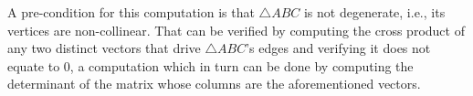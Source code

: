 A pre-condition for this computation is that $\triangle ABC$ is not degenerate,
i.e., its vertices are non-collinear.  That can be verified by computing the
cross product of any two distinct vectors that drive $\triangle ABC$'s edges and
verifying it does not equate to $0$, a computation which in turn can be done by
computing the determinant of the matrix whose columns are the aforementioned
vectors.
%
{\color{cyan}
\begin{comment}{}
The Laplace expansion for the determinant of a generic matrix $A \in
\mathbb{R}^{n \times n}$ is given by
%
\begin{align}
  \det(A) = \begin{vmatrix}
              a_{11} & \cdots & a_{1n} \\
              \vdots & \ddots & \vdots \\
              a_{n1} & \cdots & a_{nn}
            \end{vmatrix}
          &= a_{1j} C_{1j} + \cdots + a_{nj} C_{nj}%
            = a_{i1} C_{i1} + \cdots + a_{in} C_{in} \nonumber \\
          &= \sum_{i'=1}^n a_{i'j}C_{i'j}%
            \label{eq:matrix.det.laplace.nxn.col} \\
          &= \sum_{j'=1}^n a_{ij'}C_{ij'}%
            \label{eq:matrix.det.laplace.nxn.row},
\end{align}
%
where $i,j \in [1,n] \subset \mathbb{N}$,
%
\begin{equation}\label{eq:matrix.cofactor}
  C_{ij} = (-1)^{i+j} \det(A_{ij})
\end{equation}
%
is the $i,j$ cofactor of $A$, and
%
\begin{equation}\label{eq:matrix.minor}
  A_{ij} = \begin{bmatrix}
    a_{11}     & \cdots & a_{1j-1}     & a_{1j+1}     & \cdots & a_{1n}     \\%
    \vdots     & \ddots & \vdots       & \vdots       & \ddots & \vdots     \\%
    a_{i-1\,1} & \cdots & a_{i-1\,j-1} & a_{i-1\,j+1} & \cdots & a_{i-1\,1} \\%
    a_{i+1\,1} & \cdots & a_{i+1\,j-1} & a_{i+1\,j+1} & \cdots & a_{i+1\,1} \\%
    \vdots     & \ddots & \vdots       & \vdots       & \ddots & \vdots     \\%
    a_{n1}     & \cdots & a_{nj-1}     & a_{nj+1}     & \cdots & a_{nn}     \\
  \end{bmatrix}_{(n - 1) \times (n - 1)}

\end{comment}}
